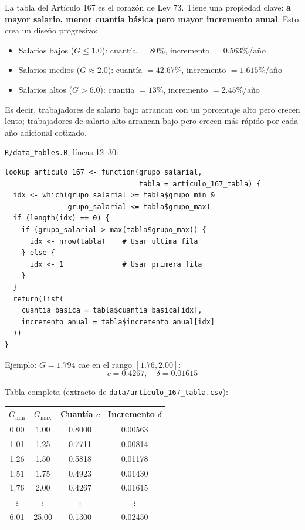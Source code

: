 \documentclass[11pt,a4paper]{report}
\theoremstyle{remark}
\begin{document}
\begin{tcolorbox}[colback=green!5!white, colframe=green!50!black, title=\textbf{Intuici\'on}]
La tabla del Art\'iculo 167 es el coraz\'on de Ley 73. Tiene una propiedad clave: \textbf{a mayor salario, menor cuant\'ia b\'asica pero mayor incremento anual}. Esto crea un dise\~no progresivo:
\begin{itemize}
  \item Salarios bajos ($G \leq 1.0$): cuant\'ia $= 80\%$, incremento $= 0.563\%$/a\~no
  \item Salarios medios ($G \approx 2.0$): cuant\'ia $= 42.67\%$, incremento $= 1.615\%$/a\~no
  \item Salarios altos ($G > 6.0$): cuant\'ia $= 13\%$, incremento $= 2.45\%$/a\~no
\end{itemize}

Es decir, trabajadores de salario bajo arrancan con un porcentaje alto pero crecen lento; trabajadores de salario alto arrancan bajo pero crecen m\'as r\'apido por cada a\~no adicional cotizado.
\end{tcolorbox}

\begin{tcolorbox}[colback=orange!5!white, colframe=orange!75!black, title=\textbf{Aplicaci\'on en C\'odigo}]
\texttt{R/data\_tables.R}, l\'ineas 12--30:
\begin{lstlisting}
lookup_articulo_167 <- function(grupo_salarial,
                                tabla = articulo_167_tabla) {
  idx <- which(grupo_salarial >= tabla$grupo_min &
               grupo_salarial <= tabla$grupo_max)
  if (length(idx) == 0) {
    if (grupo_salarial > max(tabla$grupo_max)) {
      idx <- nrow(tabla)    # Usar ultima fila
    } else {
      idx <- 1              # Usar primera fila
    }
  }
  return(list(
    cuantia_basica = tabla$cuantia_basica[idx],
    incremento_anual = tabla$incremento_anual[idx]
  ))
}
\end{lstlisting}

Ejemplo: $G = 1.794$ cae en el rango $[1.76, 2.00]$:
\[
c = 0.4267, \quad \delta = 0.01615
\]

Tabla completa (extracto de \texttt{data/articulo\_167\_tabla.csv}):
\begin{center}
\small
\begin{tabular}{cccc}
\toprule
$G_{\min}$ & $G_{\max}$ & Cuant\'ia $c$ & Incremento $\delta$ \\
\midrule
0.00 & 1.00 & 0.8000 & 0.00563 \\
1.01 & 1.25 & 0.7711 & 0.00814 \\
1.26 & 1.50 & 0.5818 & 0.01178 \\
1.51 & 1.75 & 0.4923 & 0.01430 \\
1.76 & 2.00 & 0.4267 & 0.01615 \\
$\vdots$ & $\vdots$ & $\vdots$ & $\vdots$ \\
6.01 & 25.00 & 0.1300 & 0.02450 \\
\bottomrule
\end{tabular}
\end{center}
\end{tcolorbox}
\end{document}
